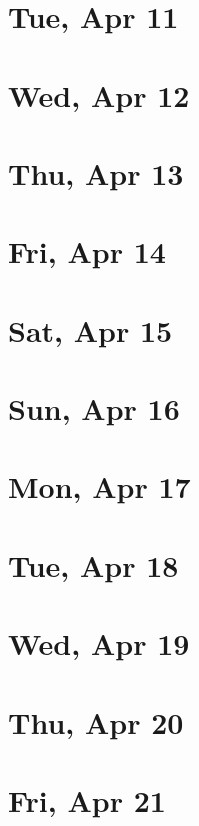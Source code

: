 	\section{Tue, Apr 11}
		
	\section{Wed, Apr 12}
		
	\section{Thu, Apr 13}
		
	\section{Fri, Apr 14}
		
	\section{Sat, Apr 15}
		
	\section{Sun, Apr 16}
		
	\section{Mon, Apr 17}
		
	\section{Tue, Apr 18}
		
	\section{Wed, Apr 19}
		
	\section{Thu, Apr 20}
		
	\section{Fri, Apr 21}
		
